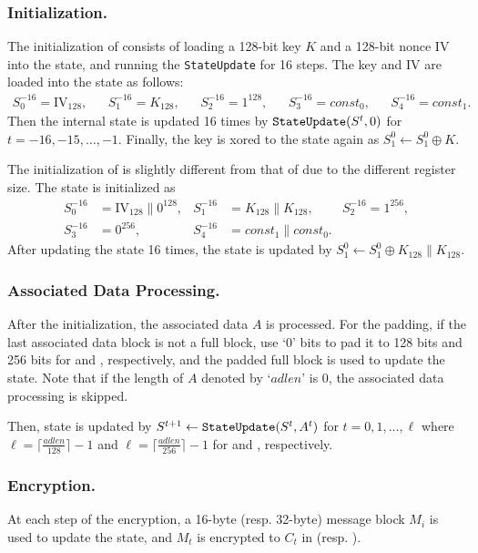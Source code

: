 \documentclass{llncs}
\begin{document}
\subsubsection{Initialization.}
The initialization of  consists of loading a 128-bit key $K$ and a 128-bit nonce IV into the state, and running the {\tt StateUpdate} for 16 steps. The key and IV are loaded into the state as follows:
\begin{align*}
S^{-16}_0 = \textrm{IV}_{128}, &&
S^{-16}_1 = K_{128}, &&
S^{-16}_2 = 1^{128}, &&
S^{-16}_3 = const_0, &&
S^{-16}_4 = const_1.
\end{align*}
Then the internal state is updated 16 times by  ${\tt StateUpdate}(S^t,0)$ for $t=-16,-15,\ldots,-1$. Finally, the key is xored to the state again as $S^0_1 \leftarrow S^0_1 \oplus K$.

The initialization of  is slightly different from that of  due to the different register size. The state is initialized as
\begin{align*}
S^{-16}_0 &= \textrm{IV}_{128} \| 0^{128}, &
S^{-16}_1 &= K_{128}\|K_{128}, &
S^{-16}_2 = 1^{256}, \\
S^{-16}_3 &= 0^{256}, &
S^{-16}_4 &= const_1\|const_0.
\end{align*}
After updating the state 16 times, the state is updated by $S^0_1 \leftarrow S^0_1 \oplus K_{128}\|K_{128}$.


\subsubsection{Associated Data Processing.}
After the initialization, the associated data $A$ is processed. For the padding, if the last associated data block is not a full block, use `0' bits to pad it to 128 bits and 256 bits for  and , respectively, and the padded full block is used to update the state. Note that if the length of $A$ denoted by `$adlen$' is 0, the associated data processing is skipped.

Then, state is updated by $S^{t+1} \leftarrow {\tt StateUpdate}(S^t, A^t)$ for $t=0,1,\ldots,\ell$ where $\ell = \lceil \frac{adlen}{128} \rceil -1$ and $\ell = \lceil \frac{adlen}{256} \rceil -1$ for  and , respectively.

\subsubsection{Encryption.}
At each step of the encryption, a 16-byte (resp. 32-byte) message block $M_i$ is used to update the state, and $M_t$ is encrypted to $C_t$ in  (resp. ).
\end{document}
